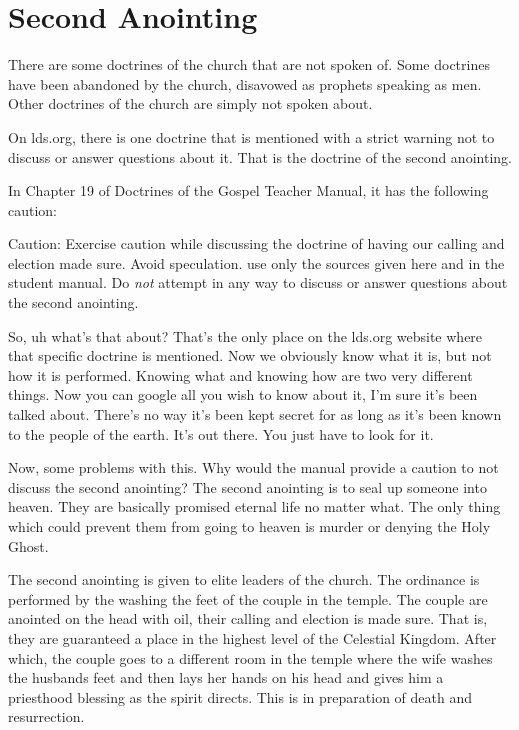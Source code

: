 \chapter{Second Anointing}

There are some doctrines of the church that are not spoken of. Some doctrines 
have been abandoned by the church, disavowed as prophets speaking as men. 
Other doctrines of the church are simply not spoken about.

On lds.org, there is one doctrine that is mentioned with a strict warning not to 
discuss or answer questions about it. That is the doctrine of the second 
anointing.

In Chapter 19 of Doctrines of the Gospel Teacher Manual, it has the following 
caution:

\begin{displayquote}
Caution: Exercise caution while discussing the doctrine of having our calling 
and election made sure. Avoid speculation. use only the sources given here and 
in the student manual. Do \textit{not} attempt in any way to discuss or answer 
questions about the second anointing.
\end{displayquote}

So, uh what’s that about? That’s the only place on the lds.org website where 
that specific doctrine is mentioned. Now we obviously know what it is, but not 
how it is performed. Knowing what and knowing how are two very different things. 
Now you can google all you wish to know about it, I’m sure it’s been talked 
about. There’s no way it’s been kept secret for as long as it’s been known to 
the people of the earth. It’s out there. You just have to look for it.

 Now, some problems with this. Why would the manual provide a caution to not 
 discuss the second anointing? The second anointing is to seal up someone into 
 heaven. They are basically promised eternal life no matter what. The only thing 
 which could prevent them from going to heaven is murder or denying the Holy 
 Ghost.
 
 The second anointing is given to elite leaders of the church. The ordinance is 
 performed by the washing the feet of the couple in the temple. The couple are 
 anointed on the head with oil, their calling and election is made sure. That 
 is, they are guaranteed a place in the highest level of the Celestial Kingdom. 
 After which, the couple goes to a different room in the temple where the wife 
 washes the husbands feet and then lays her hands on his head and gives him a 
 priesthood blessing as the spirit directs. This is in preparation of death and 
 resurrection.
 
